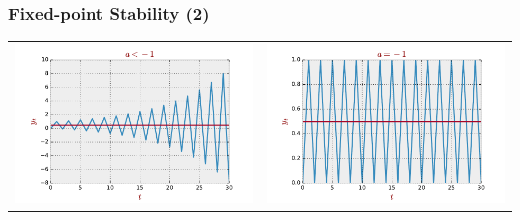 \documentclass[10pt,usenames,dvipsnames]{beamer}
\theoremstyle{plain}
\theoremstyle{definition}
\begin{document}
\begin{frame}[fragile]
\frametitle{Fixed-point Stability (2)}
\begin{center}
	\begin{tabular}{cc}
		\includegraphics[scale=0.3]{./figs/fig1} & \includegraphics[scale=0.3]{./figs/fig2}\\

\end{tabular}
\end{center}
\end{frame}
\end{document}
